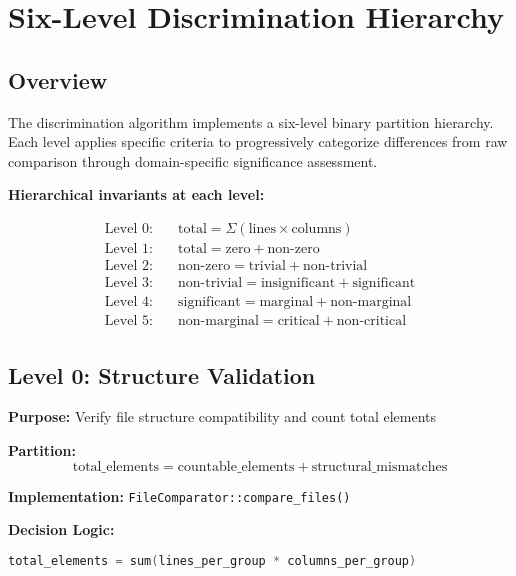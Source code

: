 \section{Six-Level Discrimination Hierarchy}
\label{sec:hierarchy}

\subsection{Overview}

The discrimination algorithm implements a six-level binary partition hierarchy. Each level applies specific criteria to progressively categorize differences from raw comparison through domain-specific significance assessment.

\textbf{Hierarchical invariants at each level:}

\begin{align*}
    \text{Level 0:} \quad & \text{total} = \Sigma(\text{lines} \times \text{columns}) \\
    \text{Level 1:} \quad & \text{total} = \text{zero} + \text{non-zero} \\
    \text{Level 2:} \quad & \text{non-zero} = \text{trivial} + \text{non-trivial} \\
    \text{Level 3:} \quad & \text{non-trivial} = \text{insignificant} + \text{significant} \\
    \text{Level 4:} \quad & \text{significant} = \text{marginal} + \text{non-marginal} \\
    \text{Level 5:} \quad & \text{non-marginal} = \text{critical} + \text{non-critical}
\end{align*}

\subsection{Level 0: Structure Validation}

\textbf{Purpose:} Verify file structure compatibility and count total elements

\textbf{Partition:}
\begin{equation}
    \text{total\_elements} = \text{countable\_elements} + \text{structural\_mismatches}
\end{equation}

\textbf{Implementation:} \texttt{FileComparator::compare\_files()}

\textbf{Decision Logic:}
\begin{lstlisting}[language=C++]
total_elements = sum(lines_per_group * columns_per_group)
\end{lstlisting}

